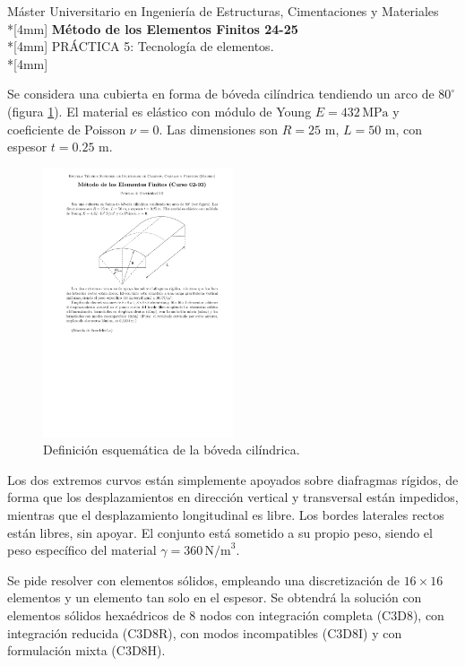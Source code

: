 \documentclass[a4paper,12pt]{article}
\begin{document}
\mbox{}\vspace*{-45mm}


{\centering
{\small\sc %
Máster Universitario en Ingeniería de Estructuras, Cimentaciones y Materiales}\\*[4mm]
{\Large\bf Método de los Elementos Finitos 24-25}\\*[4mm]
PRÁCTICA 5: Tecnología de elementos. \\*[4mm]}

Se considera una cubierta en forma de bóveda cilíndrica tendiendo un arco de $80^{\circ}$ (figura \ref{fig:esquema}). El material es elástico con módulo de Young $E=432\,\text{MPa}$ y coeficiente de Poisson $\nu=0$.
Las dimensiones son $R=25$ m, $L=50$ m, con espesor $t=0.25$ m.
\begin{figure}[!ht]
\centering
\includegraphics[width=0.5\textwidth]{boveda_scordelis-lo}
\caption{Definición esquemática de la bóveda cilíndrica. }
\label{fig:esquema}
\end{figure}

Los dos extremos curvos están simplemente apoyados sobre diafragmas rígidos, de forma que los desplazamientos en dirección vertical y transversal están impedidos, mientras que el desplazamiento longitudinal es libre. 
Los bordes laterales rectos están libres, sin apoyar.
El conjunto está sometido a su propio peso, siendo el peso específico del material $\gamma=360\,\text{N/m}^{3}$.

\vspace{5mm}

Se pide resolver con elementos sólidos, empleando una discretización de $16\times 16$ elementos y un elemento tan solo en el espesor. Se obtendrá la solución con elementos sólidos hexaédricos de 8 nodos con integración completa (C3D8), con integración reducida (C3D8R), con modos incompatibles (C3D8I) y con formulación mixta (C3D8H).
\vspace{5mm}
\end{document}
